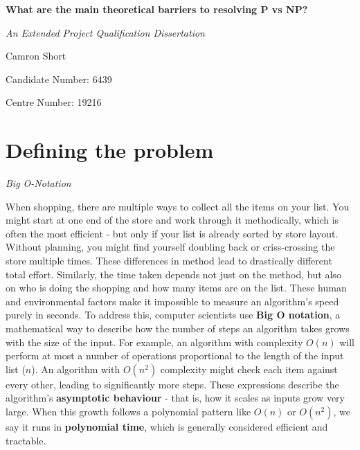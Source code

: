 \documentclass[12pt]{report}
\begin{document}
\begin{titlepage}
    \centering
    \vspace*{3cm}
    
    {\Huge\bfseries What are the main theoretical barriers to resolving P vs NP?\par}
    \vspace{1.5cm}
    
    {\Large\itshape An Extended Project Qualification Dissertation\par}
    \vspace{2cm}
    
    {\Large Camron Short\par}
    \vspace{0.5cm}
    {\large Candidate Number: 6439\par}
    {\large Centre Number: 19216\par}
    \vspace{2cm}
    
    \thispagestyle{empty}
\end{titlepage}

\section*{Defining the problem}
\begin{center}
    \vspace{0.5cm}
    {\Large\itshape Big O-Notation\par}
\end{center}
When shopping, there are multiple ways to collect all the items on your list.
You might start at one end of the store and work through it methodically, which is often the most efficient - but only if your list is already sorted by store layout.
Without planning, you might find yourself doubling back or criss-crossing the store multiple times.
These differences in method lead to drastically different total effort.
Similarly, the time taken depends not just on the method, but also on who is doing the shopping and how many items are on the list.
These human and environmental factors make it impossible to measure an algorithm's speed purely in seconds.
To address this, computer scientists use \textbf{Big O notation}, a mathematical way to describe how the number of steps an algorithm takes grows with the size of the input.
For example, an algorithm with complexity $O(n)$ will perform at most a number of operations proportional to the length of the input list ($n$).
An algorithm with $O(n^2)$ complexity might check each item against every other, leading to significantly more steps.
These expressions describe the algorithm’s \textbf{asymptotic behaviour} - that is, how it scales as inputs grow very large.
When this growth follows a polynomial pattern like $O(n)$ or $O(n^2)$, we say it runs in \textbf{polynomial time}, which is generally considered efficient and tractable.
\end{document}
